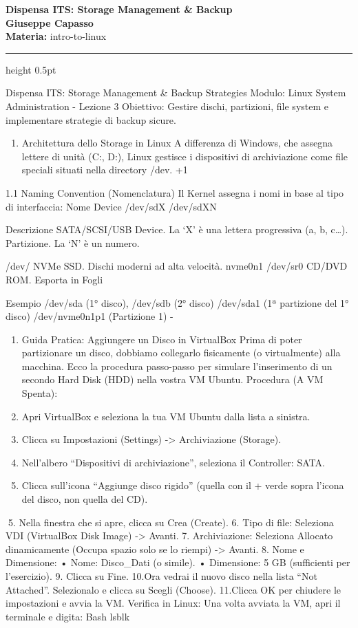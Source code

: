 \documentclass[11pt,a4paper]{article}
\providecommand{\tightlist}{%
  \setlength{\itemsep}{0pt}\setlength{\parskip}{0pt}}
\newcommand{\proposaltitle}[1]{
    \begin{center}
        \vspace*{0.1cm}
        {\LARGE \bfseries \color{blue} #1} \\[1.5ex]
        {\large \textbf{Giuseppe Capasso}} \\[1ex]
                \small{
            \vspace{0.1cm}
            \textbf{Materia:} intro-to-linux\\
        }
            \end{center}
    \vspace{0.3cm}
    \hrule height 0.5pt
    \vspace{0.5cm}
}
\begin{document}
\proposaltitle{Dispensa ITS: Storage Management & Backup}

Dispensa ITS: Storage Management \& Backup Strategies Modulo: Linux
System Administration - Lezione 3 Obiettivo: Gestire dischi, partizioni,
file system e implementare strategie di backup sicure.

\begin{enumerate}
\def\labelenumi{\arabic{enumi}.}
\tightlist
\item
  Architettura dello Storage in Linux A differenza di Windows, che
  assegna lettere di unità (C:, D:), Linux gestisce i dispositivi di
  archiviazione come file speciali situati nella directory /dev. +1
\end{enumerate}

1.1 Naming Convention (Nomenclatura) Il Kernel assegna i nomi in base al
tipo di interfaccia: Nome Device /dev/sdX /dev/sdXN

Descrizione SATA/SCSI/USB Device. La `X' è una lettera progressiva (a,
b, c\ldots). Partizione. La `N' è un numero.

/dev/ NVMe SSD. Dischi moderni ad alta velocità. nvme0n1 /dev/sr0 CD/DVD
ROM. Esporta in Fogli

Esempio /dev/sda (1° disco), /dev/sdb (2° disco) /dev/sda1 (1ª
partizione del 1° disco) /dev/nvme0n1p1 (Partizione 1) -

\begin{enumerate}
\def\labelenumi{\arabic{enumi}.}
\setcounter{enumi}{1}
\tightlist
\item
  Guida Pratica: Aggiungere un Disco in VirtualBox Prima di poter
  partizionare un disco, dobbiamo collegarlo fisicamente (o
  virtualmente) alla macchina. Ecco la procedura passo-passo per
  simulare l'inserimento di un secondo Hard Disk (HDD) nella vostra VM
  Ubuntu. Procedura (A VM Spenta):
\item
  Apri VirtualBox e seleziona la tua VM Ubuntu dalla lista a sinistra.
\item
  Clicca su Impostazioni (Settings) -\textgreater{} Archiviazione
  (Storage).
\item
  Nell'albero ``Dispositivi di archiviazione'', seleziona il Controller:
  SATA.
\item
  Clicca sull'icona ``Aggiunge disco rigido'' (quella con il + verde
  sopra l'icona del disco, non quella del CD).
\end{enumerate}

5. Nella finestra che si apre, clicca su Crea (Create). 6. Tipo di file:
Seleziona VDI (VirtualBox Disk Image) -\textgreater{} Avanti. 7.
Archiviazione: Seleziona Allocato dinamicamente (Occupa spazio solo se
lo riempi) -\textgreater{} Avanti. 8. Nome e Dimensione: • Nome:
Disco\_Dati (o simile). • Dimensione: 5 GB (sufficienti per
l'esercizio). 9. Clicca su Fine. 10.Ora vedrai il nuovo disco nella
lista ``Not Attached''. Selezionalo e clicca su Scegli (Choose).
11.Clicca OK per chiudere le impostazioni e avvia la VM. Verifica in
Linux: Una volta avviata la VM, apri il terminale e digita: Bash lsblk
\end{document}
